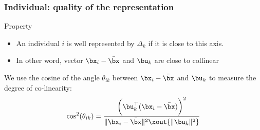 \begin{frame}[fragile]
  \frametitle{Individual: quality of the representation}
  
  \begin{block}{Property}
    \begin{itemize}
      \item  An individual $i$ is well represented by $\Delta_k$ if it is close to this axis.
      \item  In other word, vector $\bx_i - \bar{\bx}$ and $\bu_k$ are close to collinear
    \end{itemize}
  \end{block}
 
     We use the cosine of the angle $\theta_{ik}$ between $\bx_i - \bar{\bx}$ and $\bu_k$ to measure the degree of co-linearity:
     \begin{equation*}
       \cos^2(\theta_{ik}) = \frac{\bigg(\bu_k^\top (\bx_i - \bar{\bx})\bigg)^2}{\|\bx_i - \bar{\bx} \|^2 \xout{\|\bu_k \|^2}}
     \end{equation*}

\begin{knitrout}
\color{fgcolor}
\end{knitrout}
\end{frame}

